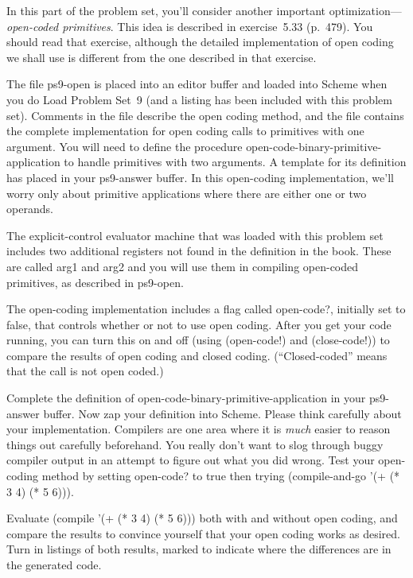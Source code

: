 In this part of the problem set, you'll consider another important
optimization---{\em open-coded primitives}.  This idea is described in
exercise~5.33 (p.~479).  You should read that exercise, although the
detailed implementation of open coding we shall use is different from
the one described in that exercise.

The file {\cf ps9-open} is placed into an editor buffer and
loaded into {\sc Scheme} when you do Load Problem Set~9
(and a listing has been included with this problem set).
Comments in the file describe the open coding method, and the file contains the
complete implementation for open coding calls to primitives with one
argument.  You will need to define the procedure {\cf
open-code-binary-primitive-application} to handle primitives with two
arguments.  A template for its definition has placed in your {\cf
ps9-answer} buffer. In this open-coding implementation, we'll worry
only about primitive applications where there are either one or two operands.

The explicit-control evaluator machine that was loaded with this
problem set includes two additional registers not found in the
definition in the book.  These are called {\cf arg1} and {\cf arg2}
and you will use them in compiling open-coded primitives, as described
in {\cf ps9-open}.

The open-coding implementation includes a flag called {\cf
open-code?}, initially set to {\cf false}, that controls whether or
not to use open coding.  After you get your code running, you can turn
this on and off (using {\cf (open-code!)} and {\cf (close-code!)}) to compare the
results of open coding and
closed coding. (``Closed-coded'' means that the call is not open coded.)

 Complete the definition of 
{\cf open-code-binary-primitive-application} in your {\cf ps9-answer} buffer.
Now zap your definition into {\sc Scheme}. Please think carefully about
your implementation.  Compilers are one area where it is {\em much} easier
to reason things out carefully beforehand.  You really don't want to
slog through buggy compiler output in an attempt to figure out what you
did wrong.  Test your open-coding method by setting {\cf open-code?}
to true then trying {\cf (compile-and-go '(+ (* 3 4) (* 5 6)))}.

 Evaluate {\cf (compile '(+ (* 3 4) (* 5 6)))}
both with and without open coding, and compare the results to
convince yourself that your open coding works as desired.  Turn in
listings of both results, marked to indicate where the differences are
in the generated code.

